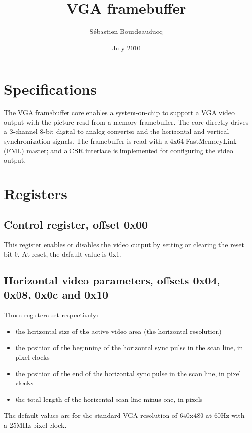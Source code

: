 \documentclass[a4paper,11pt]{article}
\title{VGA framebuffer}
\author{S\'ebastien Bourdeauducq}
\date{July 2010}
\begin{document}
\setlength{\parindent}{0pt}
\setlength{\parskip}{5pt}
\maketitle{}
\section{Specifications}
The VGA framebuffer core enables a system-on-chip to support a VGA video output with the picture read from a memory framebuffer.
The core directly drives a 3-channel 8-bit digital to analog converter and the horizontal and vertical synchronization signals.
The framebuffer is read with a 4x64 FastMemoryLink (FML) master; and a CSR interface is implemented for configuring the video output.

\section{Registers}
\subsection{Control register, offset 0x00}
This register enables or disables the video output by setting or clearing the reset bit 0. At reset, the default value is 0x1.

\subsection{Horizontal video parameters, offsets 0x04, 0x08, 0x0c and 0x10}
Those registers set respectively:
\begin{itemize}
\item the horizontal size of the active video area (the horizontal resolution)
\item the position of the beginning of the horizontal sync pulse in the scan line, in pixel clocks
\item the position of the end of the horizontal sync pulse in the scan line, in pixel clocks
\item the total length of the horizontal scan line minus one, in pixels
\end{itemize}
The default values are for the standard VGA resolution of 640x480 at 60Hz with a 25MHz pixel clock.
\end{document}
